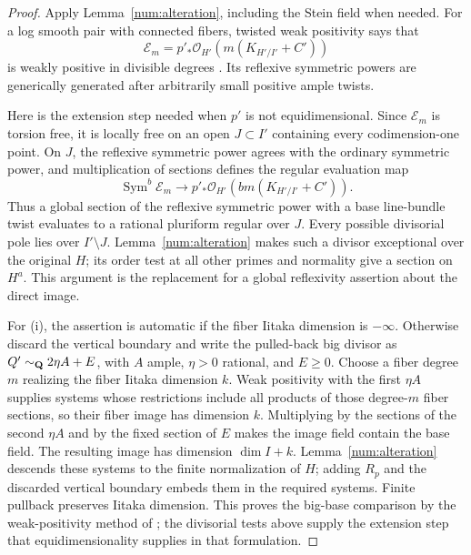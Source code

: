 \begin{proof}
Apply Lemma~\ref{num:alteration}, including the Stein field when
needed. For a log smooth pair with connected fibers, twisted weak
positivity says that
\[
 \mathcal E_m=p'_*\mathcal O_{H'}(m(K_{H'/I'}+C'))
\]
is weakly positive in divisible degrees
\cite[Theorem~1.1]{FujinoWeakPositivity}. Its reflexive symmetric
powers are generically generated after arbitrarily small positive
ample twists.

Here is the extension step needed when $p'$ is not equidimensional.
Since $\mathcal E_m$ is torsion free, it is locally free on an open
$J\subset I'$ containing every codimension-one point. On $J$, the
reflexive symmetric power agrees with the ordinary symmetric power,
and multiplication of sections defines the regular evaluation map
\[
 \operatorname{Sym}^b\mathcal E_m\longrightarrow
 p'_*\mathcal O_{H'}(bm(K_{H'/I'}+C')).
\]
Thus a global section of the reflexive symmetric power with a base
line-bundle twist evaluates to a rational pluriform regular over
$J$. Every possible divisorial pole lies over $I'\setminus J$.
Lemma~\ref{num:alteration} makes such a divisor exceptional over the
original $H$; its order test at all other primes and normality give
a section on $H^a$. This argument is the replacement for a global
reflexivity assertion about the direct image.

For (i), the assertion is automatic if the fiber Iitaka dimension is
$-\infty$.  Otherwise discard the vertical boundary and write the pulled-back big
divisor as $Q'\sim_\mathbf Q2\eta A+E$, with $A$ ample, $\eta>0$ rational,
and $E\geq0$.  Choose a fiber degree $m$ realizing the fiber Iitaka
dimension $k$.  Weak positivity with the first $\eta A$ supplies
systems whose restrictions include all products of those degree-$m$
fiber sections, so their fiber image has dimension $k$.  Multiplying
by the sections of the second $\eta A$ and by the fixed section of
$E$ makes the image field contain the base field.  The resulting
image has dimension $\dim I+k$.  Lemma~\ref{num:alteration} descends
these systems to the finite normalization of $H$; adding $R_p$ and
the discarded vertical boundary embeds them in the required systems.
Finite pullback preserves Iitaka dimension. This proves the
big-base comparison by the weak-positivity method of
\cite[Proposition~9.1]{FujinoWeakPositivity}; the divisorial tests
above supply the extension step that equidimensionality supplies
in that formulation.


\end{proof}
